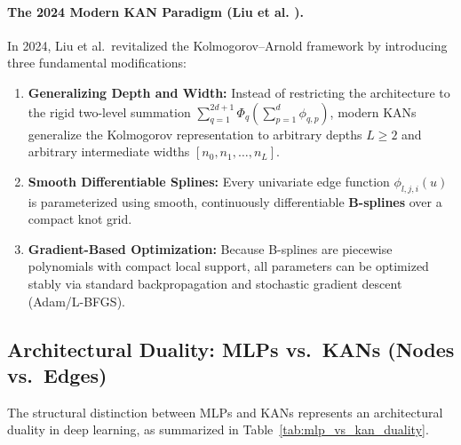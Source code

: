 \documentclass[11pt,a4paper]{article}
\theoremstyle{plain}
\theoremstyle{definition}
\theoremstyle{remark}
\begin{document}
\paragraph{The 2024 Modern KAN Paradigm (Liu et al. \cite{liu2024kan}).}
In 2024, Liu et al.\ revitalized the Kolmogorov--Arnold framework by introducing three fundamental modifications:
\begin{enumerate}
    \item \textbf{Generalizing Depth and Width:} Instead of restricting the architecture to the rigid two-level summation $\sum_{q=1}^{2d+1} \Phi_q(\sum_{p=1}^d \phi_{q, p})$, modern KANs generalize the Kolmogorov representation to arbitrary depths $L \ge 2$ and arbitrary intermediate widths $[n_0, n_1, \dots, n_L]$.
    \item \textbf{Smooth Differentiable Splines:} Every univariate edge function $\phi_{l, j, i}(u)$ is parameterized using smooth, continuously differentiable \textbf{B-splines} over a compact knot grid.
    \item \textbf{Gradient-Based Optimization:} Because B-splines are piecewise polynomials with compact local support, all parameters can be optimized stably via standard backpropagation and stochastic gradient descent (Adam/L-BFGS).
\end{enumerate}

\subsection{Architectural Duality: MLPs vs.\ KANs (Nodes vs.\ Edges)}

The structural distinction between MLPs and KANs represents an architectural duality in deep learning, as summarized in Table~\ref{tab:mlp_vs_kan_duality}.
\end{document}

